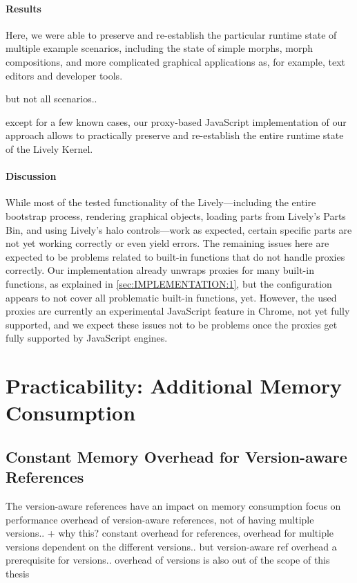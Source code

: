 \paragraph{Results}
Here, we were able to preserve and re-establish the particular runtime state of multiple example scenarios, including the state of simple morphs, morph compositions, and more complicated graphical applications as, for example, text editors and developer tools.

but not all scenarios..

except for a few known cases, our proxy-based JavaScript implementation of our approach allows to practically preserve and re-establish the entire runtime state of the Lively Kernel.

\paragraph{Discussion}
While most of the tested functionality of the Lively---including the entire bootstrap process, rendering graphical objects, loading parts from Lively's Parts Bin, and using Lively's halo controls---work as expected, certain specific parts are not yet working correctly or even yield errors.
The remaining issues here are expected to be problems related to built-in functions that do not handle proxies correctly.
Our implementation already unwraps proxies for many built-in functions, as explained in \ref{sec:IMPLEMENTATION:1}, but the configuration appears to not cover all problematic built-in functions, yet.
However, the used proxies are currently an experimental JavaScript feature in Chrome, not yet fully supported, and we expect these issues not to be problems once the proxies get fully supported by JavaScript engines.


\section{Practicability: Additional Memory Consumption} \label{sec:DISCUSSION:2}


\subsection{Constant Memory Overhead for Version-aware References}

The version-aware references have an impact on memory consumption
focus on performance overhead of version-aware references, not of having multiple versions.. + why this? constant overhead for references, overhead for multiple versions dependent on the different versions.. but version-aware ref overhead a prerequisite for versions.. overhead of versions is also out of the scope of this thesis

